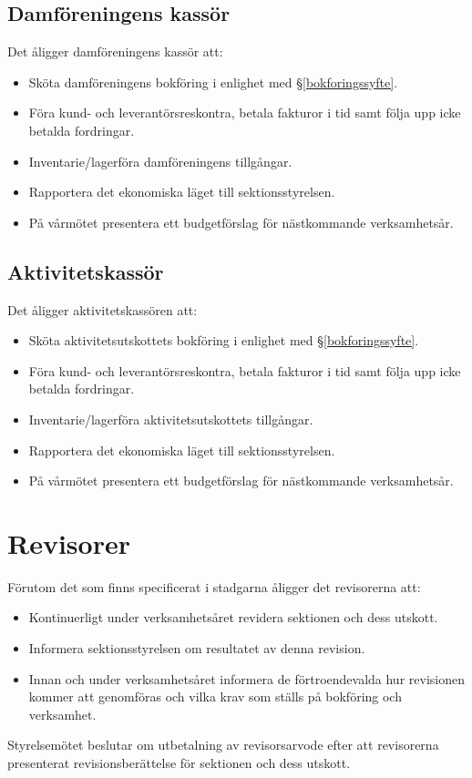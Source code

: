 \documentclass{datateknologsektionen-document}
\begin{document}
\subsection{Damföreningens kassör}
\label{damforeningskassor}
Det åligger damföreningens kassör att:
\begin{itemize}
  \item Sköta damföreningens bokföring i enlighet med \S \ref{bokforingssyfte}.
  \item Föra kund- och leverantörsreskontra, betala fakturor i tid samt följa upp icke betalda fordringar.
  \item Inventarie/lagerföra damföreningens tillgångar.
  \item Rapportera det ekonomiska läget till sektionsstyrelsen.
  \item På vårmötet presentera ett budgetförslag för nästkommande verksamhetsår.
\end{itemize}

\subsection{Aktivitetskassör}
\label{aktukassor}
Det åligger aktivitetskassören att:
\begin{itemize}
  \item Sköta aktivitetsutskottets bokföring i enlighet med \S \ref{bokforingssyfte}.
  \item Föra kund- och leverantörsreskontra, betala fakturor i tid samt följa upp icke betalda fordringar.
  \item Inventarie/lagerföra aktivitetsutskottets tillgångar.
  \item Rapportera det ekonomiska läget till sektionsstyrelsen.
  \item På vårmötet presentera ett budgetförslag för nästkommande verksamhetsår.
\end{itemize}

\section{Revisorer}
Förutom det som finns specificerat i stadgarna åligger det revisorerna att:
\begin{itemize}
  \item Kontinuerligt under verksamhetsåret revidera sektionen och dess utskott.
  \item Informera sektionsstyrelsen om resultatet av denna revision.
  \item Innan och under verksamhetsåret informera de förtroendevalda hur revisionen kommer att genomföras och vilka krav som ställs på bokföring och verksamhet.
\end{itemize}
Styrelsemötet beslutar om utbetalning av revisorsarvode efter att revisorerna presenterat
revisionsberättelse för sektionen och dess utskott.
\end{document}
